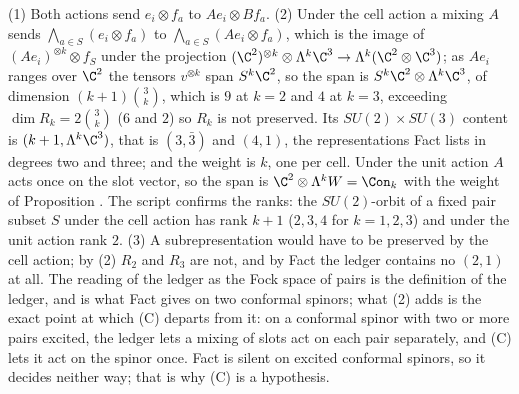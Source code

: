 (1) Both actions send $e_{i} \otimes f_{a}$ to $Ae_{i} \otimes Bf_{a}$. (2) Under the cell action a mixing $A$ sends $\bigwedge_{a \in S}(e_{i} \otimes f_{a})$ to $\bigwedge_{a \in S}(Ae_{i} \otimes f_{a})$, which is the image of $(Ae_{i})^{\otimes k} \otimes f_{S}$ under the projection $(\C^{2})^{\otimes k} \otimes \Lambda^{k}\C^{3} \to \Lambda^{k}(\C^{2} \otimes \C^{3})$; as $Ae_{i}$ ranges over $\C^{2}$ the tensors $v^{\otimes k}$ span $S^{k}\C^{2}$, so the span is $S^{k}\C^{2} \otimes \Lambda^{k}\C^{3}$, of dimension $(k+1)\binom{3}{k}$, which is $9$ at $k = 2$ and $4$ at $k = 3$, exceeding $\dim R_{k} = 2\binom{3}{k}$ ($6$ and $2$) so $R_{k}$ is not preserved. Its $SU(2) \times SU(3)$ content is $(k+1, \Lambda^{k}\C^{3})$, that is $(3,\bar{3})$ and $(4,1)$, the representations Fact  lists in degrees two and three; and the weight is $k$, one per cell. Under the unit action $A$ acts once on the slot vector, so the span is $\C^{2} \otimes \Lambda^{k}W = \Con_{k}$ with the weight of Proposition . The script confirms the ranks: the $SU(2)$-orbit of a fixed pair subset $S$ under the cell action has rank $k + 1$ ($2, 3, 4$ for $k = 1, 2, 3$) and under the unit action rank $2$. (3) A subrepresentation would have to be preserved by the cell action; by (2) $R_{2}$ and $R_{3}$ are not, and by Fact  the ledger contains no $(2,1)$ at all. The reading of the ledger as the Fock space of pairs is the definition of the ledger, and is what Fact  gives on two conformal spinors; what (2) adds is the exact point at which (C) departs from it: on a conformal spinor with two or more pairs excited, the ledger lets a mixing of slots act on each pair separately, and (C) lets it act on the spinor once. Fact  is silent on excited conformal spinors, so it decides neither way; that is why (C) is a hypothesis.
